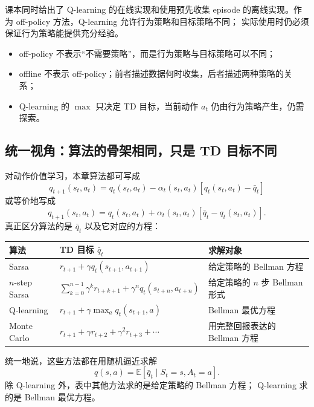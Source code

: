 \documentclass[11pt,a4paper,fontset=fandol]{ctexart}
\newcommand{\E}{\mathbb{E}}
\begin{document}
课本同时给出了 Q-learning 的在线实现和使用预先收集 episode
的离线实现。作为 off-policy 方法，Q-learning 允许行为策略和目标策略不同；
实际使用时仍必须保证行为策略能提供充分经验。

\begin{warningbox}[三个常见误解]
\begin{itemize}
  \item off-policy 不表示“不需要策略”，而是行为策略与目标策略可以不同；
  \item offline 不表示 off-policy；前者描述数据何时收集，后者描述两种策略的关系；
  \item Q-learning 的 \(\max\) 只决定 TD 目标，当前动作 \(a_t\)
  仍由行为策略产生，仍需探索。
\end{itemize}
\end{warningbox}

\subsection{统一视角：算法的骨架相同，只是 TD 目标不同}

对动作价值学习，本章算法都可写成
\[
\boxed{
q_{t+1}(s_t,a_t)
=
q_t(s_t,a_t)
-\alpha_t(s_t,a_t)
\left[q_t(s_t,a_t)-\bar q_t\right]}
\]
或等价地写成
\[
q_{t+1}(s_t,a_t)
=
q_t(s_t,a_t)
+\alpha_t(s_t,a_t)
\left[\bar q_t-q_t(s_t,a_t)\right].
\]
真正区分算法的是 \(\bar q_t\) 以及它对应的方程：

\begin{center}
\small
\begin{tabularx}{\textwidth}{
  >{\raggedright\arraybackslash}p{}
  >{\raggedright\arraybackslash}p{}
  X}
\toprule
算法 & TD 目标 \(\bar q_t\) & 求解对象\\
\midrule
Sarsa &
\(r_{t+1}+\gamma q_t(s_{t+1},a_{t+1})\) &
给定策略的 Bellman 方程\\
\(n\)-step Sarsa &
\(\sum_{k=0}^{n-1}\gamma^k r_{t+k+1}
 +\gamma^nq_t(s_{t+n},a_{t+n})\) &
给定策略的 \(n\) 步 Bellman 形式\\
Q-learning &
\(r_{t+1}+\gamma\max_a q_t(s_{t+1},a)\) &
Bellman 最优方程\\
Monte Carlo &
\(r_{t+1}+\gamma r_{t+2}+\gamma^2r_{t+3}+\cdots\) &
用完整回报表达的 Bellman 方程\\
\bottomrule
\end{tabularx}
\end{center}

统一地说，这些方法都在用随机逼近求解
\[
q(s,a)=\E[\bar q_t\mid S_t=s,A_t=a].
\]
除 Q-learning 外，表中其他方法求的是给定策略的 Bellman 方程；
Q-learning 求的是 Bellman 最优方程。
\end{document}
